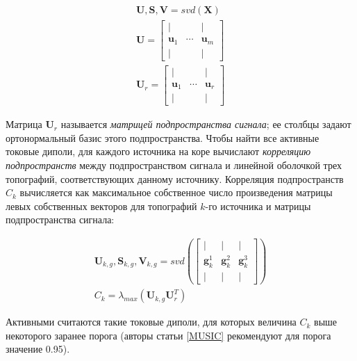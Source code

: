 \begin{gather}
    \mathbf{U}, \mathbf{S}, \mathbf{V} = svd(\mathbf{X}) \\
    \mathbf{U} =
        \begin{bmatrix}
            |                 &               & |            \\
            \mathbf{u}_1      & \cdots        & \mathbf{u}_m \\
            |                 &               & |
        \end{bmatrix}\\
    \mathbf{U}_r = 
        \begin{bmatrix}
            |                 &               & |            \\
            \mathbf{u}_1      & \cdots        & \mathbf{u}_r \\
            |                 &               & |
        \end{bmatrix}
\end{gather}

Матрица $\mathbf{U}_r$ называется \emph{матрицей подпространства сигнала};
ее столбцы задают ортонормальный базис этого подпространства.
Чтобы найти все активные токовые диполи, для каждого источника на коре
вычислают \emph{корреляцию подпространств} между подпространством сигнала и
линейной оболочкой трех топографий, соответствующих данному источнику.
Корреляция подпространств $C_k$ вычисляется как максимальное собственное число
произведения матрицы левых собственных векторов для топографий $k$-го источника
и матрицы подпространства сигнала:

\begin{gather}
    \mathbf{U}_{k,g}, \mathbf{S}_{k,g}, \mathbf{V}_{k,g} = svd\left(
            \begin{bmatrix}
                |                 & |              & |              \\
                \mathbf{g}_k^1    & \mathbf{g}_k^2 & \mathbf{g}_k^3 \\
                |                 & |              & |
            \end{bmatrix}
     \right)\\
     C_k = \lambda_{max}(\mathbf{U}_{k,g} \mathbf{U}_r^T)
\end{gather}

Активными считаются такие токовые диполи, для которых величина $C_k$ выше некоторого
заранее порога (авторы статьи \ref{MUSIC} рекомендуют для порога значение 0.95).

